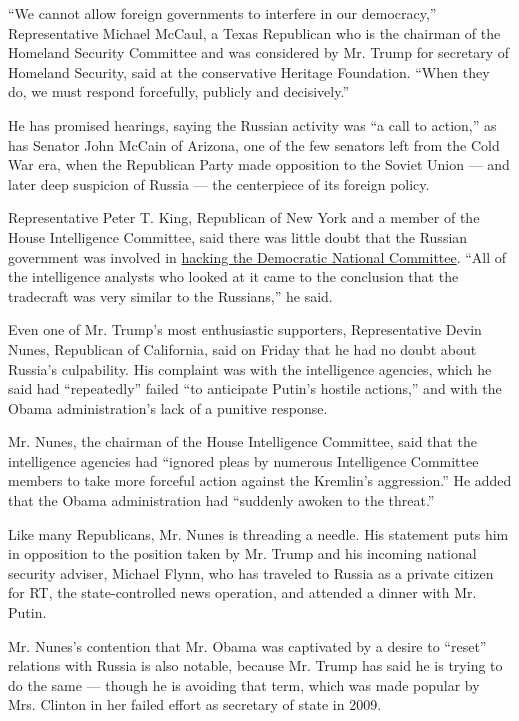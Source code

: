 ``We cannot allow foreign governments to interfere in our democracy,''
Representative Michael McCaul, a Texas Republican who is the chairman of
the Homeland Security Committee and was considered by Mr. Trump for
secretary of Homeland Security, said at the conservative Heritage
Foundation. ``When they do, we must respond forcefully, publicly and
decisively.''

He has promised hearings, saying the Russian activity was ``a call to
action,'' as has Senator John McCain of Arizona, one of the few senators
left from the Cold War era, when the Republican Party made opposition to
the Soviet Union --- and later deep suspicion of Russia --- the
centerpiece of its foreign policy.

Representative Peter T. King, Republican of New York and a member of the
House Intelligence Committee, said there was little doubt that the
Russian government was involved in
\href{https://www.nytimes.com/2016/06/15/us/politics/russian-hackers-dnc-trump.html}{hacking
the Democratic National Committee}. ``All of the intelligence analysts
who looked at it came to the conclusion that the tradecraft was very
similar to the Russians,'' he said.

Even one of Mr. Trump's most enthusiastic supporters, Representative
Devin Nunes, Republican of California, said on Friday that he had no
doubt about Russia's culpability. His complaint was with the
intelligence agencies, which he said had ``repeatedly'' failed ``to
anticipate Putin's hostile actions,'' and with the Obama
administration's lack of a punitive response.

Mr. Nunes, the chairman of the House Intelligence Committee, said that
the intelligence agencies had ``ignored pleas by numerous Intelligence
Committee members to take more forceful action against the Kremlin's
aggression.'' He added that the Obama administration had ``suddenly
awoken to the threat.''

Like many Republicans, Mr. Nunes is threading a needle. His statement
puts him in opposition to the position taken by Mr. Trump and his
incoming national security adviser, Michael Flynn, who has traveled to
Russia as a private citizen for RT, the state-controlled news operation,
and attended a dinner with Mr. Putin.

Mr. Nunes's contention that Mr. Obama was captivated by a desire to
``reset'' relations with Russia is also notable, because Mr. Trump has
said he is trying to do the same --- though he is avoiding that term,
which was made popular by Mrs. Clinton in her failed effort as secretary
of state in 2009.

